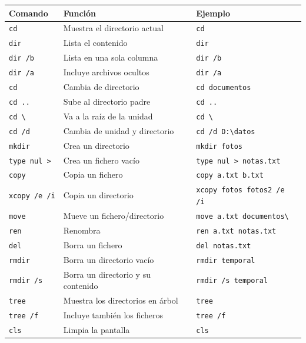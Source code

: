 \documentclass[11pt,a4paper]{article}
\begin{document}
\begin{longtable}{p{}p{}p{}}
\toprule
\textbf{Comando} & \textbf{Función} & \textbf{Ejemplo} \\
\midrule
\endhead

\texttt{cd} &
Muestra el directorio actual &
\texttt{cd} \\

\texttt{dir} &
Lista el contenido &
\texttt{dir} \\

\texttt{dir /b} &
Lista en una sola columna &
\texttt{dir /b} \\

\texttt{dir /a} &
Incluye archivos ocultos &
\texttt{dir /a} \\

\texttt{cd} &
Cambia de directorio &
\texttt{cd documentos} \\

\texttt{cd ..} &
Sube al directorio padre &
\texttt{cd ..} \\

\texttt{cd \textbackslash} &
Va a la raíz de la unidad &
\texttt{cd \textbackslash} \\

\texttt{cd /d} &
Cambia de unidad y directorio &
\texttt{cd /d D:\textbackslash datos} \\

\texttt{mkdir} &
Crea un directorio &
\texttt{mkdir fotos} \\

\texttt{type nul >} &
Crea un fichero vacío &
\texttt{type nul > notas.txt} \\

\texttt{copy} &
Copia un fichero &
\texttt{copy a.txt b.txt} \\

\texttt{xcopy /e /i} &
Copia un directorio &
\texttt{xcopy fotos fotos2 /e /i} \\

\texttt{move} &
Mueve un fichero/directorio &
\texttt{move a.txt documentos\textbackslash} \\

\texttt{ren} &
Renombra &
\texttt{ren a.txt notas.txt} \\

\texttt{del} &
Borra un fichero &
\texttt{del notas.txt} \\

\texttt{rmdir} &
Borra un directorio vacío &
\texttt{rmdir temporal} \\

\texttt{rmdir /s} &
Borra un directorio y su contenido &
\texttt{rmdir /s temporal} \\

\texttt{tree} &
Muestra los directorios en árbol &
\texttt{tree} \\

\texttt{tree /f} &
Incluye también los ficheros &
\texttt{tree /f} \\

\texttt{cls} &
Limpia la pantalla &
\texttt{cls} \\

\bottomrule
\end{longtable}
\end{document}
